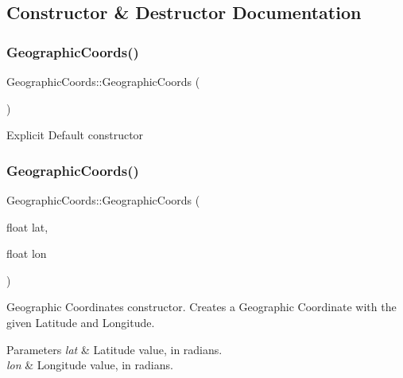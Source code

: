 \subsection{Constructor \& Destructor Documentation}
\hypertarget{class_geographic_coords_a6e58da78d507551dc7a6c39e6ffb33b3}{}\label{class_geographic_coords_a6e58da78d507551dc7a6c39e6ffb33b3} 
\subsubsection{\texorpdfstring{Geographic\+Coords()}{GeographicCoords()}\hspace{0.1cm}{\footnotesize\ttfamily [1/2]}}
{\footnotesize\ttfamily Geographic\+Coords\+::\+Geographic\+Coords (\begin{DoxyParamCaption}{ }\end{DoxyParamCaption})\hspace{0.3cm}{\ttfamily [default]}}

Explicit Default constructor \hypertarget{class_geographic_coords_a5db8168e8754a1eb2d13e3d2c8318cb4}{}\label{class_geographic_coords_a5db8168e8754a1eb2d13e3d2c8318cb4} 
\subsubsection{\texorpdfstring{Geographic\+Coords()}{GeographicCoords()}\hspace{0.1cm}{\footnotesize\ttfamily [2/2]}}
{\footnotesize\ttfamily Geographic\+Coords\+::\+Geographic\+Coords (\begin{DoxyParamCaption}\item[{float}]{lat,  }\item[{float}]{lon }\end{DoxyParamCaption})}

Geographic Coordinates constructor. Creates a Geographic Coordinate with the given Latitude and Longitude.


\begin{DoxyParams}{Parameters}
{\em lat} & Latitude value, in radians. \\
\hline
{\em lon} & Longitude value, in radians. \\
\hline
\end{DoxyParams}


